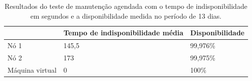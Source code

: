 \begin{table}[h!]
\caption{Resultados do teste de manutenção agendada com o tempo de indisponibilidade em segundos e a disponibilidade medida no período de 13 dias.}
\small
\label{tab:teste3resultados}
\begin{center}
\begin{tabular}{|l|p{7cm}|p{4cm}|}\hline
 & \textbf{Tempo de indisponibilidade média} & \textbf{Disponibilidade} \\\hline
Nó 1 & 145,5 & 99,976\% \\\hline
Nó 2 & 173 & 99,975\% \\\hline
Máquina virtual & 0 & 100\% \\\hline
\end{tabular}
\end{center}
\end{table}



